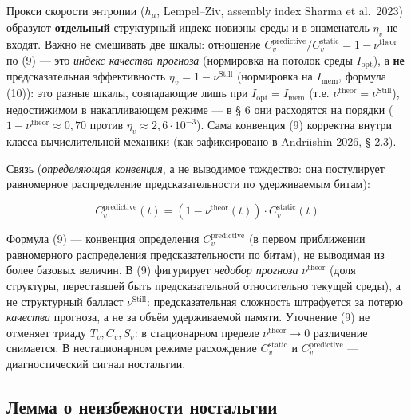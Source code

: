 \documentclass[pdflatex,sn-mathphys-ay]{sn-jnl}
\begin{document}
Прокси скорости энтропии (\(h_\mu\), Lempel--Ziv, assembly index Sharma et al.~2023) образуют \textbf{отдельный} структурный индекс новизны среды и в знаменатель \(\eta_v\) не входят. Важно не смешивать две шкалы: отношение \(C_v^{\text{predictive}}/C_v^{\text{static}} = 1 - \nu^{\text{theor}}\) по (9) --- это \emph{индекс качества прогноза} (нормировка на потолок среды \(I_{\text{opt}}\)), а \textbf{не} предсказательная эффективность \(\eta_v = 1 - \nu^{\text{Still}}\) (нормировка на \(I_{\text{mem}}\), формула (10)): это разные шкалы, совпадающие лишь при \(I_{\text{opt}} = I_{\text{mem}}\) (т.е. \(\nu^{\text{theor}} = \nu^{\text{Still}}\)), недостижимом в накапливающем режиме --- в § 6 они расходятся на порядки (\(1 - \nu^{\text{theor}} \approx 0{,}70\) против \(\eta_v \approx 2{,}6\cdot10^{-3}\)). Сама конвенция (9) корректна внутри класса вычислительной механики (как зафиксировано в Andriishin 2026, § 2.3).



Связь (\emph{определяющая конвенция}, а не выводимое тождество: она постулирует равномерное распределение предсказательности по удерживаемым битам):



\begin{equation}C_v^{\text{predictive}}(t) = (1 - \nu^{\text{theor}}(t)) \cdot C_v^{\text{static}}(t) \tag{9}\end{equation}



Формула (9) --- конвенция определения \(C_v^{\text{predictive}}\) (в первом приближении равномерного распределения предсказательности по битам), не выводимая из более базовых величин. В (9) фигурирует \emph{недобор прогноза} \(\nu^{\text{theor}}\) (доля структуры, переставшей быть предсказательной относительно текущей среды), а не структурный балласт \(\nu^{\text{Still}}\): предсказательная сложность штрафуется за потерю \emph{качества} прогноза, а не за объём удерживаемой памяти. Уточнение (9) не отменяет триаду \(T_v, C_v, S_v\): в стационарном пределе \(\nu^{\text{theor}} \to 0\) различение снимается. В нестационарном режиме расхождение \(C_v^{\text{static}}\) и \(C_v^{\text{predictive}}\) --- диагностический сигнал ностальгии.



\subsection{Лемма о неизбежности ностальгии}\label{ux43bux435ux43cux43cux430-ux43e-ux43dux435ux438ux437ux431ux435ux436ux43dux43eux441ux442ux438-ux43dux43eux441ux442ux430ux43bux44cux433ux438ux438}
\end{document}
